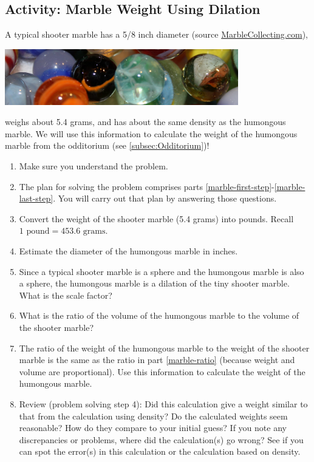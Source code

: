 \subsection{Activity: Marble Weight Using Dilation}
A typical shooter marble has a 5/8 inch diameter (source  \href{https://www.marblecollecting.com/marble-reference/how-to-size-marbles/}{MarbleCollecting.com}),
\begin{center}\includegraphics[width=4in]{images/marbles}\end{center}
weighs about 5.4 grams, and has about the same density as the humongous marble. We will use this information to calculate the weight of the humongous marble from the odditorium (see \ref{subsec:Odditorium})!
\begin{enumerate}
    \item Make sure you understand the problem.
    \item The plan for solving the problem comprises parts \ref{marble-first-step}-\ref{marble-last-step}. You will carry out that plan by answering those questions.
    \item \label{marble-first-step}Convert the weight of the shooter marble (5.4 grams) into pounds. Recall $1\text{ pound}=453.6\text{ grams}$.\wbvfill
    \item Estimate the diameter of the humongous marble in inches.\wbvfill
    \item Since a typical shooter marble is a sphere and the humongous marble is also a sphere, the humongous marble is a dilation of the tiny shooter marble. What is the scale factor?\wbvfill
    \item \label{marble-ratio}What is the ratio of the volume of the humongous marble to the volume of the shooter marble?\wbvfill
    \item \label{marble-last-step}The ratio of the weight of the humongous marble to the weight of the shooter marble is the same as the ratio in part \ref{marble-ratio} (because weight and volume are proportional). Use this information to calculate the weight of the humongous marble.\wbvfill
    \item Review (problem solving step 4): Did this calculation give a weight similar to that from the calculation using density? Do the calculated weights seem reasonable? How do they compare to your initial guess? If you note any discrepancies or problems, where did the calculation(s) go wrong? See if you can spot the error(s) in this calculation or the calculation based on density.
\end{enumerate}

